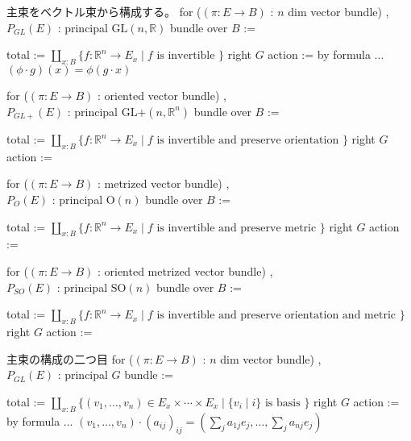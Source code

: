\begin{Definition}
\itemnote
  主束をベクトル束から構成する。
\itemdefi
  for (\((\pi : E \to B)\) : \(n\) dim vector bundle) ,\\
  \(P_{GL}(E)\) : principal \(\text{GL}(n , \mathbb{R})\) bundle over \(B\) :=
  \begin{itemize}
    \itemenum total := \(\coprod_{x : B} \{f : \mathbb{R}^n \to E_x \mid f \text{ is invertible }\}\)
    \itemenum right \(G\) action := by formula ... \((\phi \cdot g)(x) = \phi(g \cdot x)\)
  \end{itemize}
\itemdefi
  for (\((\pi : E \to B)\) : oriented vector bundle) ,\\
  \(P_{GL+}(E)\) : principal \(\text{GL+}(n , \mathbb{R}^n)\) bundle over \(B\) :=
  \begin{itemize}
    \itemenum total := \(\coprod_{x : B} \{f : \mathbb{R}^n \to E_x \mid f \text{ is invertible and preserve orientation }\}\)
    \itemenum right \(G\) action := 
  \end{itemize}
\itemdefi
  for (\((\pi : E \to B)\) : metrized vector bundle) ,\\
  \(P_{O}(E)\) : principal \(\text{O}(n)\) bundle over \(B\) :=
  \begin{itemize}
    \itemenum total := \(\coprod_{x : B} \{f : \mathbb{R}^n \to E_x \mid f \text{ is invertible and preserve metric }\}\)
    \itemenum right \(G\) action := 
  \end{itemize}
\itemdefi
  for (\((\pi : E \to B)\) : oriented metrized vector bundle) ,\\
  \(P_{SO}(E)\) : principal \(\text{SO}(n)\) bundle over \(B\) :=
  \begin{itemize}
    \itemenum total := \(\coprod_{x : B} \{f : \mathbb{R}^n \to E_x \mid f \text{ is invertible and preserve orientation and metric }\}\)
    \itemenum right \(G\) action := 
  \end{itemize}
\end{Definition}

\begin{Definition}
\itemnote
  主束の構成の二つ目
\itemdefi
  for (\((\pi : E \to B)\) : \(n\) dim vector bundle) ,\\
  \(P_{GL}(E)\) : principal \(G\) bundle := 
  \begin{itemize}
    \itemenum total := \(\coprod_{x : B} \{(v_1 , \ldots , v_n) \in E_x \times \cdots \times E_x \mid \{v_i \mid i\} \text{ is basis }\}\)
    \itemenum right \(G\) action := by formula ... \((v_1 , \ldots , v_n) \cdot (a_{ij})_{ij} = (\sum_j a_{1j} e_j , \ldots , \sum_j a_{nj} e_j)\)
  \end{itemize}
\itemdefi
\end{Definition}

